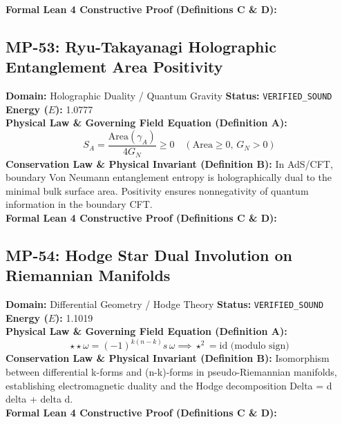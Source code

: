 \textbf{Formal Lean 4 Constructive Proof (Definitions C \& D):}


\vspace{1em}
\subsection{MP-53: Ryu-Takayanagi Holographic Entanglement Area Positivity}
\textbf{Domain:} Holographic Duality / Quantum Gravity \hfill \textbf{Status:} \texttt{VERIFIED\_SOUND} \hfill \textbf{Energy ($E$):} 1.0777\\
\textbf{Physical Law \& Governing Field Equation (Definition A):}
\begin{equation*}
S_A = \frac{\text{Area}(\gamma_A)}{4 G_N} \ge 0 \quad (\text{Area} \ge 0, \, G_N > 0)
\end{equation*}
\textbf{Conservation Law \& Physical Invariant (Definition B):}
In AdS/CFT, boundary Von Neumann entanglement entropy is holographically dual to the minimal bulk surface area. Positivity ensures nonnegativity of quantum information in the boundary CFT.\\

\textbf{Formal Lean 4 Constructive Proof (Definitions C \& D):}


\vspace{1em}
\subsection{MP-54: Hodge Star Dual Involution on Riemannian Manifolds}
\textbf{Domain:} Differential Geometry / Hodge Theory \hfill \textbf{Status:} \texttt{VERIFIED\_SOUND} \hfill \textbf{Energy ($E$):} 1.1019\\
\textbf{Physical Law \& Governing Field Equation (Definition A):}
\begin{equation*}
\star \star \omega = (-1)^{k(n-k)} s \, \omega \implies \star^2 = \text{id} \text{ (modulo sign)}
\end{equation*}
\textbf{Conservation Law \& Physical Invariant (Definition B):}
Isomorphism between differential k-forms and (n-k)-forms in pseudo-Riemannian manifolds, establishing electromagnetic duality and the Hodge decomposition Delta = d delta + delta d.\\

\textbf{Formal Lean 4 Constructive Proof (Definitions C \& D):}


